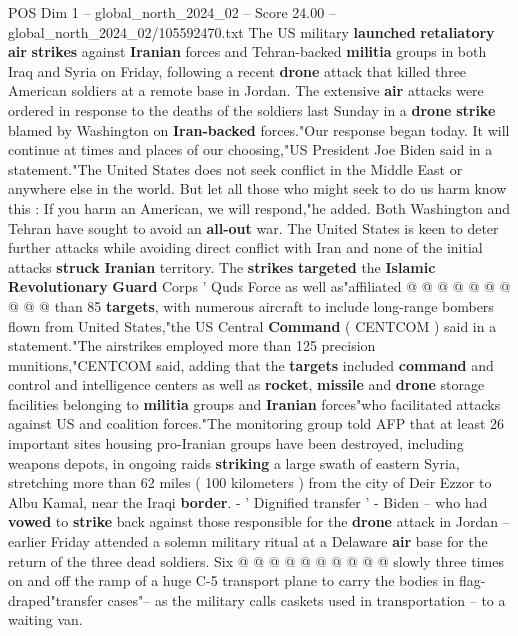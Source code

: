 \begin{textsample}{POS Dim 1 – global\_north\_2024\_02 – Score 24.00 – global\_north\_2024\_02/105592470.txt}  \label{ex:f1_pos_277}
The US military \textbf{launched} \textbf{retaliatory} \textbf{air} \textbf{strikes} against \textbf{Iranian} forces and Tehran-backed \textbf{militia} groups in both Iraq and Syria on Friday, following a recent \textbf{drone} attack that killed three American soldiers at a remote base in Jordan.
The extensive \textbf{air} attacks were ordered in response to the deaths of the soldiers last Sunday in a \textbf{drone} \textbf{strike} blamed by Washington on \textbf{Iran-backed} forces."Our response began today.
It will continue at times and places of our choosing,"US President Joe Biden said in a statement."The United States does not seek conflict in the Middle East or anywhere else in the world.
But let all those who might seek to do us harm know this : If you harm an American, we will respond,"he added.
Both Washington and Tehran have sought to avoid an \textbf{all-out} war.
The United States is keen to deter further attacks while avoiding direct conflict with Iran and none of the initial attacks \textbf{struck} \textbf{Iranian} territory.
The \textbf{strikes} \textbf{targeted} the \textbf{Islamic} \textbf{Revolutionary} \textbf{Guard} Corps ' Quds Force as well as"affiliated @ @ @ @ @ @ @ @ @ @ than 85 \textbf{targets}, with numerous aircraft to include long-range bombers flown from United States,"the US Central \textbf{Command} ( CENTCOM ) said in a statement."The airstrikes employed more than 125 precision munitions,"CENTCOM said, adding that the \textbf{targets} included \textbf{command} and control and intelligence centers as well as \textbf{rocket}, \textbf{missile} and \textbf{drone} storage facilities belonging to \textbf{militia} groups and \textbf{Iranian} forces"who facilitated attacks against US and coalition forces."The monitoring group told AFP that at least 26 important sites housing pro-Iranian groups have been destroyed, including weapons depots, in ongoing raids \textbf{striking} a large swath of eastern Syria, stretching more than 62 miles ( 100 kilometers ) from the city of Deir Ezzor to Albu Kamal, near the Iraqi \textbf{border}. - ' Dignified transfer ' - Biden -- who had \textbf{vowed} to \textbf{strike} back against those responsible for the \textbf{drone} attack in Jordan -- earlier Friday attended a solemn military ritual at a Delaware \textbf{air} base for the return of the three dead soldiers.
Six @ @ @ @ @ @ @ @ @ @ slowly three times on and off the ramp of a huge C-5 transport plane to carry the bodies in flag-draped"transfer cases"-- as the military calls caskets used in transportation -- to a waiting van.

\end{textsample}
